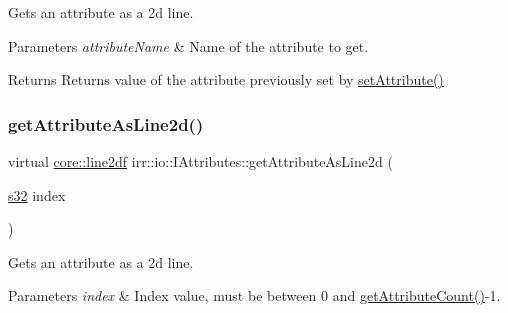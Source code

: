 Gets an attribute as a 2d line. 


\begin{DoxyParams}{Parameters}
{\em attribute\+Name} & Name of the attribute to get. \\
\hline
\end{DoxyParams}
\begin{DoxyReturn}{Returns}
Returns value of the attribute previously set by \hyperlink{classirr_1_1io_1_1IAttributes_a03fa31acb481ae23678676cc183f09a6}{set\+Attribute()} 
\end{DoxyReturn}
\mbox{\label{classirr_1_1io_1_1IAttributes_aa03235ad3ff3eb4468c424c171ee652f}} 
\subsubsection{\texorpdfstring{get\+Attribute\+As\+Line2d()}{getAttributeAsLine2d()}\hspace{0.1cm}{\footnotesize\ttfamily [2/2]}}
{\footnotesize\ttfamily virtual \hyperlink{namespaceirr_1_1core_a19bbe2f8741053a37be916e9ea42e456}{core\+::line2df} irr\+::io\+::\+I\+Attributes\+::get\+Attribute\+As\+Line2d (\begin{DoxyParamCaption}\item[{\hyperlink{namespaceirr_ac66849b7a6ed16e30ebede579f9b47c6}{s32}}]{index }\end{DoxyParamCaption})\hspace{0.3cm}{\ttfamily [pure virtual]}}



Gets an attribute as a 2d line. 


\begin{DoxyParams}{Parameters}
{\em index} & Index value, must be between 0 and \hyperlink{classirr_1_1io_1_1IAttributes_a796bdd9440ee7ba0b6742a90a82870b6}{get\+Attribute\+Count()}-\/1. \\
\hline
\end{DoxyParams}
\mbox{\label{classirr_1_1io_1_1IAttributes_ab6da415d43f2a4211026b191b17b0938}} 
